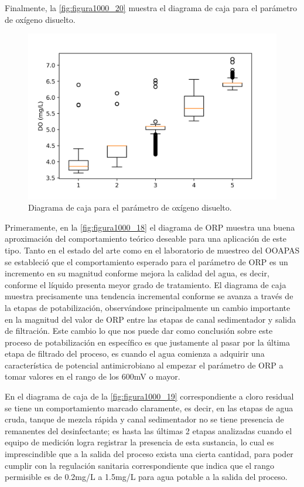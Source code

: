 \clearpage

Finalmente, la \autoref{fig:figura1000_20} muestra el diagrama de caja para el parámetro de oxígeno disuelto.

\begin{figure}[h]
	\centering
	\includegraphics[scale=1.0]{imgss170.png}
	\caption{Diagrama de caja para el parámetro de oxígeno disuelto.}
	\label{fig:figura1000_20}
\end{figure}

Primeramente, en la \autoref{fig:figura1000_18} el diagrama de ORP muestra una buena aproximación del comportamiento teórico deseable para una aplicación de este tipo. Tanto en el estado del arte como en el laboratorio de 
muestreo del OOAPAS se estableció que el comportamiento esperado para el parámetro de ORP es un incremento en su magnitud conforme mejora la calidad del agua, es decir, conforme el líquido presenta meyor grado de tratamiento.
El diagrama de caja muestra precisamente una tendencia incremental conforme se avanza a través de la etapas de potabilización, observándose principalmente un cambio importante en la magnitud del valor de ORP entre las etapas 
de canal sedimentador y salida de filtración. Este cambio lo que nos puede dar como conclusión sobre este proceso de potabilización en específico es que justamente al pasar por la última etapa de filtrado del proceso, es 
cuando el agua comienza a adquirir una característica de potencial antimicrobiano al empezar el parámetro de ORP a tomar valores en el rango de los 600mV o mayor.

En el diagrama de caja de la \autoref{fig:figura1000_19} correspondiente a cloro residual se tiene un comportamiento marcado claramente, es decir, en las etapas de agua cruda, tanque de mezcla rápida y canal sedimentador 
no se tiene presencia de remanentes del desinfectante; es hasta las últimas 2 etapas analizadas cuando el equipo de medición logra registrar la presencia de esta sustancia, lo cual es imprescindible que a la salida del 
proceso exista una cierta cantidad, para poder cumplir con la regulación sanitaria correspondiente que indica que el rango permisible es de 0.2mg/L a 1.5mg/L para agua potable a la salida del proceso.

